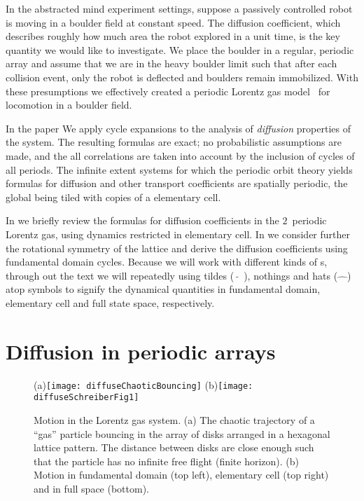 \documentclass[aps,pre,showpacs,preprint,groupedaddress,floatfix]{revtex4-1}
\begin{document}
In the abstracted mind experiment settings, suppose a passively controlled robot is moving in a boulder field at constant speed. The diffusion coefficient, which describes roughly how much area the robot explored in a unit time, is the key quantity we would like to investigate. We place the boulder in a regular, periodic array and assume that we are in the heavy boulder limit such that after each collision event, only the robot is deflected and boulders remain immobilized. With these presumptions we effectively created a periodic Lorentz gas model~\cite{} for locomotion in a boulder field.

In the paper We apply cycle expansions to the analysis of {\em diffusion}
properties of the system. The resulting formulas are exact; no
probabilistic assumptions are made, and the all correlations are taken
into account by the inclusion of cycles of all periods. The infinite
extent systems for which the periodic orbit theory yields formulas for
diffusion and other transport coefficients are spatially periodic, the
global {\statesp} being tiled with copies of a elementary cell.

In  we briefly review the formulas for diffusion
coefficients in the $2$\dmn\ periodic Lorentz
gas, using dynamics restricted in elementary cell. In we consider further the rotational symmetry of the lattice and derive the diffusion coefficients using
fundamental domain cycles. Because we will work with different kinds of
\statesp s, through out the text we will repeatedly using tildes
($\tilde{\quad}$), nothings and hats ($\hat{\quad}$) atop symbols to
signify the dynamical quantities in fundamental domain, elementary cell
and full state space, respectively.

\section{Diffusion in periodic arrays}
\label{s-DiffPerArr}

\begin{figure}[htbp]
\begin{center}
(a)\texttt{[image: diffuseChaoticBouncing]}
(b)\texttt{[image: diffuseSchreiberFig1]}
\end{center}
\caption[]{\label{fig-chaoticBouncing}
    Motion in the Lorentz gas system. (a) The chaotic trajectory of a ``gas'' particle bouncing in the array of disks arranged in a hexagonal lattice pattern. The distance between disks are close enough such that the particle has no infinite free flight (finite horizon). (b) Motion in fundamental domain (top left), elementary cell (top right) and in full space (bottom). }
\end{figure}
\end{document}
